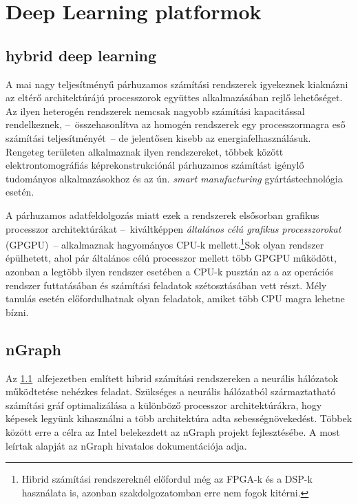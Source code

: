 \chapter{Deep Learning platformok}
\section{hybrid deep learning} \label{sect:hybridDL}
A mai nagy teljesítményű párhuzamos számítási rendszerek igyekeznek kiaknázni az eltérő architektúrájú processzorok együttes alkalmazásában rejlő lehetőséget. Az ilyen heterogén rendszerek nemcsak nagyobb számítási kapacitással rendelkeznek, --~összehasonlítva az homogén rendszerek egy processzormagra eső számítási teljesítményét~-- de jelentősen kisebb az energiafelhasználásuk. Rengeteg területen alkalmaznak ilyen rendszereket, többek között elektrontomográfiás képrekonstrukciónál\cite{agulleiro2012} párhuzamos számítást igénylő tudományos alkalmazásokhoz\cite{meredith2011} és az ún. \emph{smart manufacturing} gyártástechnológia esetén.\cite{li2019}

A párhuzamos adatfeldolgozás miatt ezek a rendszerek elsősorban grafikus processzor architektúrákat --~kiváltképpen \emph{általános célú grafikus processzorokat} (GPGPU)~-- alkalmaznak hagyományos CPU-k mellett.\footnote{Hibrid számítási rendszereknél előfordul még az FPGA-k és a DSP-k használata is, azonban szakdolgozatomban erre nem fogok kitérni.}Sok olyan rendszer épülhetett, ahol pár általános célú processzor mellett több GPGPU működött, azonban a legtöbb ilyen rendszer esetében a CPU-k pusztán az a az operációs rendszer futtatásában és számítási feladatok szétosztásában vett részt. Mély tanulás esetén előfordulhatnak olyan feladatok, amiket több CPU magra lehetne bízni.



\section{nGraph}
Az \ref{sect:hybridDL}~alfejezetben említett hibrid számítási rendszereken a neurális hálózatok működtetése nehézkes feladat. Szükséges a neurális hálózatból származtatható számítási gráf optimalizálása a különböző processzor architektúrákra, hogy képesek legyünk kihasználni a több architektúra adta sebességnövekedést. Többek között erre a célra az Intel belekezdett az nGraph projekt fejlesztésébe. A most leírtak alapját az nGraph hivatalos dokumentációja adja\cite{web:ngraph_intro}.

